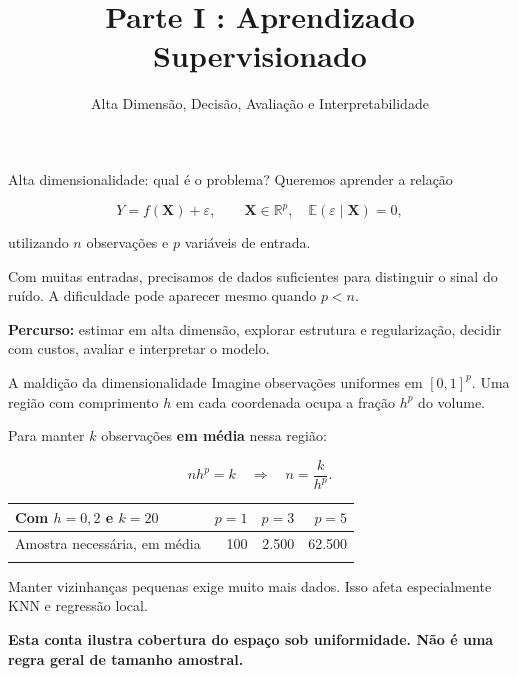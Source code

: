 \documentclass[
  10pt,
  ignorenonframetext,
  aspectratio=169,
  brazilian,
]{beamer}
\title{\texorpdfstring{Parte I : Aprendizado
Supervisionado}{Parte I : Aprendizado Supervisionado}}
\subtitle{\texorpdfstring{Alta Dimensão, Decisão, Avaliação e
Interpretabilidade}{Alta Dimensão, Decisão, Avaliação e Interpretabilidade}}
\author{}
\date{}
\newcounter{none} %
\begin{document}
\frame{\titlepage}


\begin{frame}
\end{frame}

\begin{frame}{Alta dimensionalidade: qual é o problema?}
\protect{}\label{alta-dimensionalidade-qual-uxe9-o-problema}
Queremos aprender a relação

\[
Y=f(\mathbf X)+\varepsilon,\qquad \mathbf X\in\mathbb R^p,
\quad \mathbb E(\varepsilon\mid\mathbf X)=0,
\]

utilizando \(n\) observações e \(p\) variáveis de entrada.

Com muitas entradas, precisamos de dados suficientes para distinguir o
sinal do ruído. A dificuldade pode aparecer mesmo quando \(p<n\).

\textbf{Percurso:} estimar em alta dimensão, explorar estrutura e
regularização, decidir com custos, avaliar e interpretar o modelo.
\end{frame}

\begin{frame}{A maldição da dimensionalidade}
\protect{}\label{a-maldiuxe7uxe3o-da-dimensionalidade}
Imagine observações uniformes em \([0,1]^p\). Uma região com comprimento
\(h\) em cada coordenada ocupa a fração \(h^p\) do volume.

Para manter \(k\) observações \textbf{em média} nessa região:

\[
\boxed{nh^p=k\quad\Longrightarrow\quad n=\frac{k}{h^p}.}
\]

{\def\LTcaptype{none} %
\begin{longtable}[]{@{}lrrr@{}}
\toprule\noalign{}
Com \(h=0{,}2\) e \(k=20\) & \(p=1\) & \(p=3\) & \(p=5\) \\
\midrule\noalign{}
\endhead
Amostra necessária, em média & 100 & 2.500 & 62.500 \\
\bottomrule\noalign{}
\end{longtable}
}

Manter vizinhanças pequenas exige muito mais dados. Isso afeta
especialmente KNN e regressão local.

\textbf{Esta conta ilustra cobertura do espaço sob uniformidade. Não é
uma regra geral de tamanho amostral.}
\end{frame}
\end{document}
